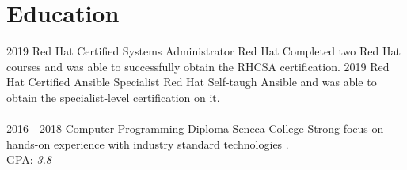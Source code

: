 \documentclass[]{friggeri-cv}
\begin{document}
\section{Education}
\begin{entrylist}
  \entry
    {2019}
    {Red Hat Certified Systems Administrator}
    {Red Hat}
    {Completed two Red Hat courses and was able to successfully obtain the RHCSA certification.}
  \entry
    {2019}
    {Red Hat Certified Ansible Specialist}
    {Red Hat}
    {Self-taugh Ansible and was able to obtain the specialist-level certification on it.\\
    \emph{}\\}
  \entry
    {2016 - 2018}
    {Computer Programming Diploma}
    {Seneca College}
    {Strong focus on hands-on experience with industry standard technologies .\\
    {GPA: \emph{3.8}\\}
    \\}
\end{entrylist}
\let\clearpage\relax
\end{document}
